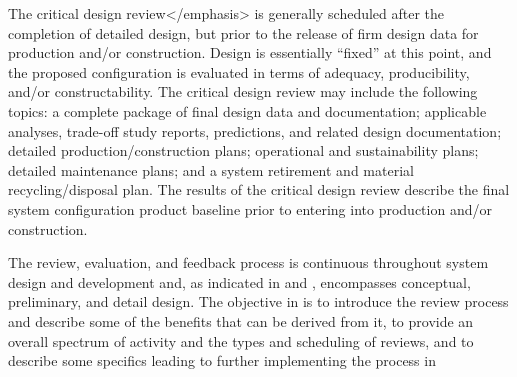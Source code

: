 The critical design review</emphasis> is generally scheduled after the completion of detailed design, but prior to the release of firm design data for production and/or construction. Design is essentially ``fixed'' at this point, and the proposed configuration is evaluated in terms of adequacy, producibility, and/or constructability. The critical design review may include the following topics: a complete package of final design data and documentation; applicable analyses, trade-off study reports, predictions, and related design documentation; detailed production/construction plans; operational and sustainability plans; detailed maintenance plans; and a system retirement and material recycling/disposal plan. The results of the critical design review describe the final system configuration product baseline prior to entering into production and/or construction.

The review, evaluation, and feedback process is continuous throughout system design and development and, as indicated in and , encompasses conceptual, preliminary, and detail design. The objective in is to introduce the review process and describe some of the benefits that can be derived from it, to provide an overall spectrum of activity and the types and scheduling of reviews, and to describe some specifics leading to further implementing the process in